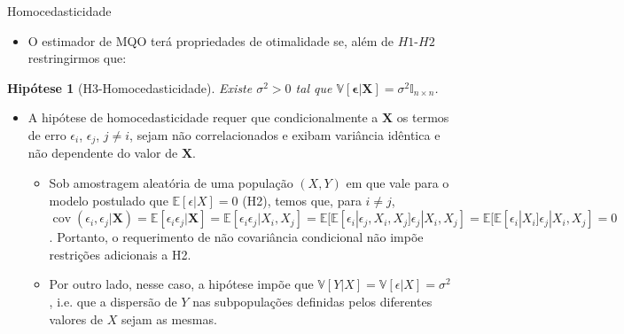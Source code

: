 \documentclass[11pt]{beamer}
\newtheorem{assumption}{Hipótese}
\begin{document}
\begin{frame}{Homocedasticidade}
	\begin{itemize}
		\item O estimador de MQO terá propriedades de otimalidade se, além de $H1$-$H2$ restringirmos que:
	\end{itemize}
	\begin{assumption}[H3-Homocedasticidade]
		Existe $\sigma^2 > 0$ tal que $\mathbb{V}[\boldsymbol{\epsilon}|\boldsymbol{X}] = \sigma^2 \mathbb{I}_{n\times n}$.
	\end{assumption}
	\begin{itemize}
		\item A hipótese de homocedasticidade requer que condicionalmente a $\boldsymbol{X}$ os termos de erro $\epsilon_i$, $\epsilon_j$, $j \neq i$, sejam não correlacionados e exibam variância idêntica {\color{red}e não dependente do valor de $\boldsymbol{X}$}.
		\begin{itemize}
			\item Sob  amostragem aleatória de uma população $(X,Y)$ em que vale para o modelo postulado que $\mathbb{E}[\epsilon|X]=0$ (H2), temos que, para $i\neq j$, $\operatorname{cov}(\epsilon_i,\epsilon_j|\boldsymbol{X}) = \mathbb{E}[\epsilon_i\epsilon_j|\boldsymbol{X}]  =\mathbb{E}[\epsilon_i\epsilon_j|X_i, X_j] = \mathbb{E}[\mathbb{E}[\epsilon_i|\epsilon_j, X_i, X_j]\epsilon_j|X_i, X_j] =    \mathbb{E}[\mathbb{E}[\epsilon_i|X_i]\epsilon_j|X_i, X_j] = 0$. Portanto, o requerimento de não covariância condicional não impõe restrições adicionais a H2.
			\item Por outro lado, nesse caso, a hipótese impõe que $\mathbb{V}[Y|X] =\mathbb{V}[\epsilon|X] = \sigma^2$, i.e. que a dispersão de $Y$ nas subpopulações definidas pelos diferentes valores de $X$ sejam as mesmas.
		\end{itemize}
	\end{itemize}
\end{frame}
\end{document}
